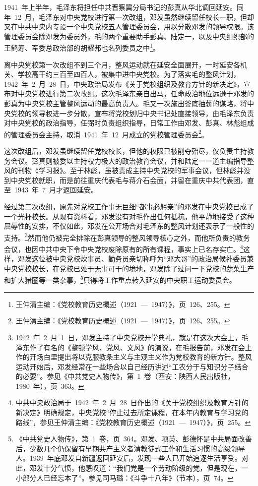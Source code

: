 1941~年上半年，毛泽东将担任中共晋察冀分局书记的彭真从华北调回延安。同年~12~月，毛泽东对中央党校进行第一次改组，邓发虽然继续留任校长一职，但却又在中共中央内专设一个中央党校五人管理委员会，用以分散邓发的领导权限。该管理委员会除邓发为委员外，毛的两个重要助手彭真、陆定一，以及中央组织部的王鹤寿、军委总政治部的胡耀邦也名列委员之中\footnote{王仲清主编：《党校教育历史概述（1921~—~1947）》，页~126、255。}。

离中央党校第一次改组不到三个月，整风运动就在延安全面展开，一时延安各机关、学校高干约三百至四百人，被集中进中央党校。为了落实毛的整风计划，1942~年~2~月~28~日，中央政治局发布《关于党校组织及教育方针的新决定》，宣布对中央党校进行第二次改组。这次毛泽东亲自出马，任命政治地位远逊于邓发的彭真为中央党校主管整风运动的最高负责人。毛又一次施出釜底抽薪的谋略，将中央党校的领导权进一步分散，宣布将党校划归中央书记处直接领导，由毛泽东负责对中央党校的政治指导，任弼时负责组织指导，日常工作由邓发、彭真、林彪组成的管理委员会主持，取消~1941~年~12~月成立的党校管理委员会\footnote{王仲清主编：《党校教育历史概述（1921~—~1947）》，页~126、255。}。

这次改组后，邓发虽继续留任党校校长，但他的权限已被削夺殆尽，仅负责主持教务会议。彭真则被委以主持权力极大的政治教育会议，并和陆定一一道主编指导整风的刊物《学习报》。至于林彪，虽被责成主持中央党校的军事会议，但林彪并没到中央党校就职，而是前往重庆代表毛与蒋介石会面，并留在重庆中共代表团，直至~1943~年~7~月才返回延安。

经过第二次改组，原先对党校工作事无巨细“都事必躬亲”的邓发在中央党校已成了一个光杆校长。从现有资料看，邓发没有对毛作出任何抵抗，他平静地接受了这种屈辱性的安排，不仅如此，邓发在公开场合对毛泽东的整风计划还表示了一般性的支持。\footnote{1942~年~2~月~1~日，邓发主持了中央党校开学典礼，就是在这次大会上，毛泽东作了有名的《整顿学风、党风、文风》的演说，在毛报告前，邓发在会上作的开场白里提出将以克服教条主义与主观主义作为党校教育的新方针。整风运动开始后，邓发经常在一些场合以自己经历讲述“工农分于与知识分子结合的必要”。参见《中共党史人物传》，第~1~卷（西安：陕西人民出版社，1980~年），页~363。}然而他仍被完全排除在彭真领导的整风领导核心之外，而他所负责的教务会议，也因中共中央下令中央党校废除原有的所有课程，事实上已名存实亡。\footnote{中共中央政治局于~1942~年~2~月~28~日作出的《关于党校组织及教育方针的新决定》明确规定，中央党校“停止过去所定课程，在本年内教育与学习党的路线”，参见王仲清主编：《党校教育历史概述（1921~—~1947）》，页~255。}这样，邓发这位被中央党校炊事员、勤务员亲切称呼为“邓大哥”的政治局候补委员兼中央党校校长，在党校已处于无事可干的境地，邓发除了过问一下党校的蔬菜生产和扩大猪圈等一类杂事，\footnote{《中共党史人物传》，第~1~卷，页~364。邓发、项英、彭德怀是中共局面改善后，少数几个仍保留有早期共产主义者清教徒式工作和生活习惯的高级领导人。1939~年底邓发自新疆返回延安后，发现一些人已开始追逐生活享受。对此，邓发十分气愤，他感叹道：“我们党是一个劳动阶级的党，但是现在，一小部分人已经忘本了”。参见司马璐：《斗争十八年》（节本），页~74。}只得将工作重点转入延安的中央职工运动委员会。


